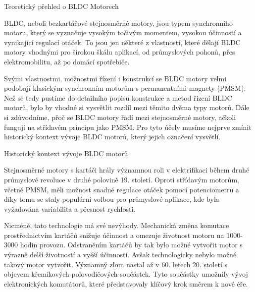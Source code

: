 
\chap Teoretický přehled o BLDC Motorech

BLDC, neboli bezkartáčové stejnosměrné motory, jsou typem
synchronního motoru, který se 
vyznačuje vysokým točivým momentem, vysokou účinností a vynikající regulací otáček. 
To jsou jen některé z vlastností, které dělají BLDC motory vhodnými pro širokou škálu aplikací, od průmyslových pohonů, 
přes elektromobilitu, až po domácí spotřebiče. 

Svými vlastnostmi, možnostmi řízení i konstrukcí se BLDC motory velmi podobají klasickým synchronním motorům s permanentními magnety (PMSM).
Než se tedy pustíme do detailního popisu konstrukce a metod řízení BLDC motorů, bylo by vhodné si vysvětlit rozdíl mezi těmito dvěma typy motorů.
Dále si zdůvodníme, přoč se BLDC motory řadí mezi stejnosměrné motory, ačkoli fungují na střídavém principu jako PMSM. Pro tyto účely musíme
nejprve zmínit historický kontext vývoje BLDC motorů, který jejich označení vysvětlí.


\sec Historický kontext vývoje BLDC motorů %

Stejnosměrné motory s kartáči hrály významnou roli v elektrifikaci během druhé průmyslové revoluce v druhé polovině 19. století. 
Oproti střídavým motorům, včetně PMSM, měli možnost snadné regulace otáček pomocí potenciometru a díky tomu se staly populární volbou pro
průmyslové aplikace, kde byla vyžadována variabilita a přesnost rychlosti. 

Nicméně, tato technologie má své nevýhody. Mechanická změna komutace prostřednictvím kartáčů snižuje účinnost a omezuje životnost
 motoru na 1000-3000 hodin provozu. Odstraněním kartáčů by tak bylo možné vytvořit motor s výrazně delší životností a vyšší účinností. 
 Avšak technologicky nebylo možné takový motor vytvořit. Významný zlom nastal až v 60. letech 20. století s objevem křemíkových polovodičových součástek.
 Tyto součástky umožnily vývoj elektronických komutátorů, které představovaly klíčový krok směrem k nové éře.
 
